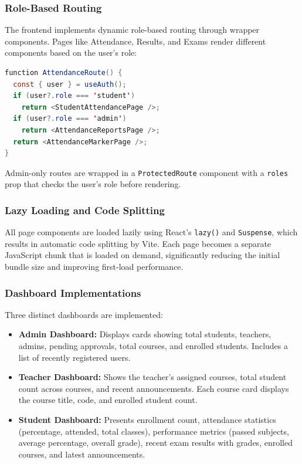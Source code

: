 \subsubsection{Role-Based Routing}

The frontend implements dynamic role-based routing through wrapper components. Pages like Attendance, Results, and Exams render different components based on the user's role:

\begin{lstlisting}[language=Java, caption={Role-Based Route Component}]
function AttendanceRoute() {
  const { user } = useAuth();
  if (user?.role === 'student') 
    return <StudentAttendancePage />;
  if (user?.role === 'admin') 
    return <AttendanceReportsPage />;
  return <AttendanceMarkerPage />;
}
\end{lstlisting}

Admin-only routes are wrapped in a \texttt{ProtectedRoute} component with a \texttt{roles} prop that checks the user's role before rendering.

\subsubsection{Lazy Loading and Code Splitting}

All page components are loaded lazily using React's \texttt{lazy()} and \texttt{Suspense}, which results in automatic code splitting by Vite. Each page becomes a separate JavaScript chunk that is loaded on demand, significantly reducing the initial bundle size and improving first-load performance.

\subsubsection{Dashboard Implementations}

Three distinct dashboards are implemented:

\begin{itemize}[leftmargin=2em]
    \item \textbf{Admin Dashboard:} Displays cards showing total students, teachers, admins, pending approvals, total courses, and enrolled students. Includes a list of recently registered users.
    
    \item \textbf{Teacher Dashboard:} Shows the teacher's assigned courses, total student count across courses, and recent announcements. Each course card displays the course title, code, and enrolled student count.
    
    \item \textbf{Student Dashboard:} Presents enrollment count, attendance statistics (percentage, attended, total classes), performance metrics (passed subjects, average percentage, overall grade), recent exam results with grades, enrolled courses, and latest announcements.
\end{itemize}

